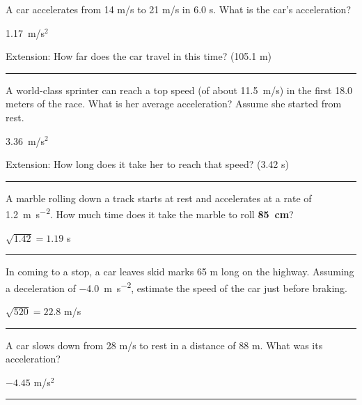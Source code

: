 \documentclass[12pt]{exam}
\begin{document}

\def\mystrut{\protect\rule[-2.2ex]{0ex}{2.2ex}} 
\qformat{ \textbf{Task \#\thequestion}
  \ifthenelse{\equal{\thequestion}{\thequestiontitle}}
    {}
    {: \emph{\thequestiontitle}}
  \mystrut  \hfill}


\begin{questions}


\question
  A car accelerates from 14 m/s to 21 m/s in 6.0 s.  What is the car's acceleration?

  \begin{solution}
    1.17~m/s$^2$

    Extension: How far does the car travel in this time? (105.1 m)
  \end{solution}


\vs \hrule \vs

\question
  A world-class sprinter can reach a top speed (of about 11.5~m/s) in the first 18.0 meters of the race.  What is her average acceleration?  Assume she started from rest.

  \begin{solution}
    3.36~m/s$^2$

    Extension: How long does it take her to reach that speed? (3.42 s)

  \end{solution}

\vs
\ifprintanswers
  \hrule \vs
\else
  \pagebreak

\fi

\question
  A marble rolling down a track starts at rest and accelerates at a rate of \SI{1.2}{\meter\per\second^2}.  How much time does it take the marble to roll {\bf 85~cm}?

  \begin{solution}
    $\sqrt{1.42}=1.19$ s
  \end{solution}

  

\vs \hrule \vs

\question
  In coming to a stop, a car leaves skid marks 65 m long on the highway.  Assuming a deceleration of \SI{-4.0}{\meter\per\second^2}, estimate the speed of the car just before braking.

  \begin{solution}
    $\sqrt{520}=22.8$ m/s
  \end{solution}

\vs
\ifprintanswers
  \hrule \vs
\else
  \pagebreak
\fi

\question
  A car slows down from 28 m/s to rest in a distance of 88 m. What was its acceleration?

  \begin{solution}
    $-4.45$ m/s$^2$
  \end{solution}

\vs \hrule \vs[2]


\end{questions}
\end{document}
